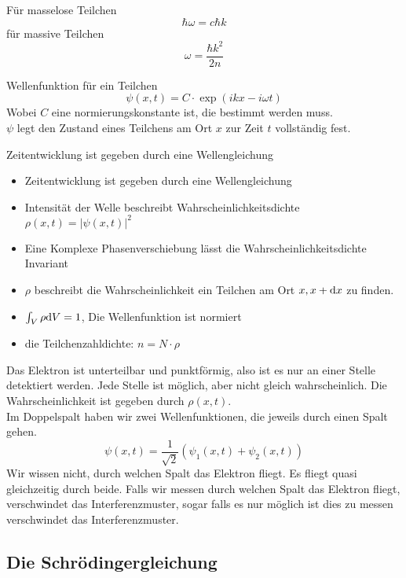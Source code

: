 Für masselose Teilchen
$$
\hbar\omega = c\hbar k
$$
für massive Teilchen
$$
\omega = \frac{\hbar k^2}{2n}
$$

Wellenfunktion für ein Teilchen
$$
\psi(x,t) = C \cdot \exp (ikx - i\omega t)
$$
Wobei $C$ eine normierungskonstante ist, die bestimmt werden muss.\\
$\psi$ legt den Zustand eines Teilchens am Ort $x$ zur Zeit $t$ vollständig fest.

Zeitentwicklung ist gegeben durch eine Wellengleichung
\begin{itemize}
	\item Zeitentwicklung ist gegeben durch eine Wellengleichung
	\item Intensität der Welle beschreibt Wahrscheinlichkeitsdichte $\rho(x,t) = |\psi(x,t)|^2$
	\item Eine Komplexe Phasenverschiebung lässt die Wahrscheinlichkeitsdichte Invariant
	\item $\rho$ beschreibt die Wahrscheinlichkeit ein Teilchen am Ort $x, x+\text dx$ zu finden.
	\item $\int_V \rho \text dV = 1$, Die Wellenfunktion ist normiert
	\item die Teilchenzahldichte: $n = N\cdot \rho$
\end{itemize}
Das Elektron ist unterteilbar und punktförmig, also ist es nur an einer Stelle detektiert werden. Jede Stelle ist möglich, aber nicht gleich wahrscheinlich. Die Wahrscheinlichkeit ist gegeben durch $\rho(x,t)$.\\
Im Doppelspalt haben wir zwei Wellenfunktionen, die jeweils durch einen Spalt gehen.
\begin{equation}
	\psi(x,t) = \frac{1}{\sqrt 2}\left(\psi_1(x,t) + \psi_2(x,t)\right)
\end{equation}
Wir wissen nicht, durch welchen Spalt das Elektron fliegt. Es fliegt quasi gleichzeitig durch beide. Falls wir messen durch welchen Spalt das Elektron fliegt, verschwindet das Interferenzmuster, sogar falls es nur möglich ist dies zu messen verschwindet das Interferenzmuster.

\subsection{Die Schrödingergleichung}

